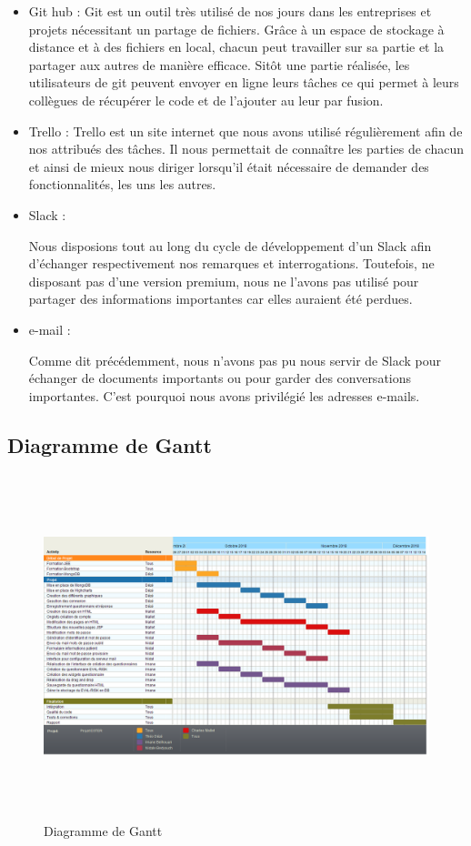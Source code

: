 \begin{itemize}
\item Git hub : 
Git est un outil très utilisé de nos jours dans les entreprises et projets nécessitant un partage de fichiers. Grâce à un espace de stockage à distance et à des fichiers en local, chacun peut travailler sur sa partie et la partager aux autres de manière efficace. Sitôt une partie réalisée, les utilisateurs de git peuvent envoyer en ligne leurs tâches ce qui permet à leurs collègues de récupérer le code et de l'ajouter au leur par fusion.

\item Trello :
Trello est un site internet que nous avons utilisé régulièrement afin de nos attribués des tâches. Il nous permettait de connaître les parties de chacun et ainsi de mieux nous diriger lorsqu'il était nécessaire de demander des fonctionnalités, les uns les autres.

\item Slack :

Nous disposions tout au long du cycle de développement d'un Slack afin d'échanger respectivement nos remarques et interrogations. Toutefois, ne disposant pas d'une version premium, nous ne l'avons pas utilisé pour partager des informations importantes car elles auraient été perdues.

\item e-mail :

Comme dit précédemment, nous n'avons pas pu nous servir de Slack pour échanger de documents importants ou pour garder des conversations importantes. C'est pourquoi nous avons privilégié les adresses e-mails.

\end{itemize}


\subsection{Diagramme de Gantt}

\begin{figure}[H]
    \begin{center}
    \includegraphics[height=10.0cm]{img/gantt}
    \end{center}
    \caption{Diagramme de Gantt}
\end{figure}

